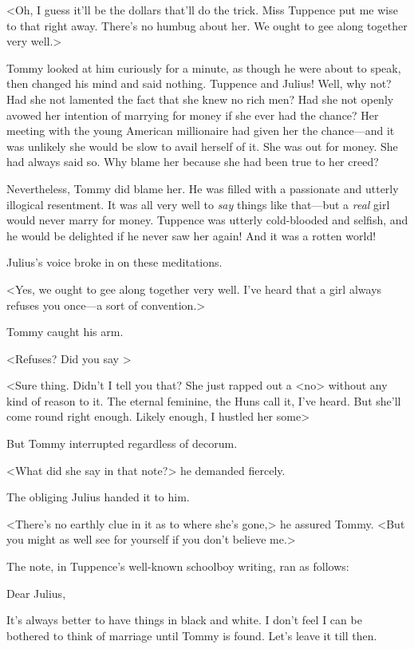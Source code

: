 <Oh, I guess it'll be the dollars that'll do the trick. Miss Tuppence put me wise to that right away. There's no humbug about her. We ought to gee along together very well.>

Tommy looked at him curiously for a minute, as though he were about to speak, then changed his mind and said nothing. Tuppence and Julius! Well, why not? Had she not lamented the fact that she knew no rich men? Had she not openly avowed her intention of marrying for money if she ever had the chance? Her meeting with the young American millionaire had given her the chance—and it was unlikely she would be slow to avail herself of it. She was out for money. She had always said so. Why blame her because she had been true to her creed?

Nevertheless, Tommy did blame her. He was filled with a passionate and utterly illogical resentment. It was all very well to \emph{say} things like that—but a \emph{real} girl would never marry for money. Tuppence was utterly cold-blooded and selfish, and he would be delighted if he never saw her again! And it was a rotten world!

Julius's voice broke in on these meditations.

<Yes, we ought to gee along together very well. I've heard that a girl always refuses you once—a sort of convention.>

Tommy caught his arm.

<Refuses? Did you say >

<Sure thing. Didn't I tell you that? She just rapped out a <no> without any kind of reason to it. The eternal feminine, the Huns call it, I've heard. But she'll come round right enough. Likely enough, I hustled her some\longdash>

But Tommy interrupted regardless of decorum.

<What did she say in that note?> he demanded fiercely.

The obliging Julius handed it to him.

<There's no earthly clue in it as to where she's gone,> he assured Tommy. <But you might as well see for yourself if you don't believe me.>

The note, in Tuppence's well-known schoolboy writing, ran as follows:

\begin{mail}{}{Dear Julius,}

It's always better to have things in black and white. I don't feel I can be bothered to think of marriage until Tommy is found. Let's leave it till then.

\end{mail}


